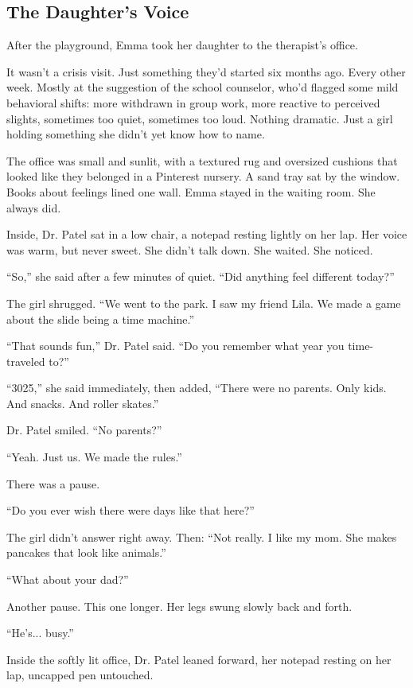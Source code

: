 \subsection{The Daughter’s Voice}

After the playground, Emma took her daughter to the therapist’s office.

It wasn’t a crisis visit. Just something they’d started six months ago. Every other week. Mostly at the suggestion of the school counselor, who’d flagged some mild behavioral shifts: more withdrawn in group work, more reactive to perceived slights, sometimes too quiet, sometimes too loud. Nothing dramatic. Just a girl holding something she didn’t yet know how to name.

The office was small and sunlit, with a textured rug and oversized cushions that looked like they belonged in a Pinterest nursery. A sand tray sat by the window. Books about feelings lined one wall. Emma stayed in the waiting room. She always did.

Inside, Dr. Patel sat in a low chair, a notepad resting lightly on her lap. Her voice was warm, but never sweet. She didn’t talk down. She waited. She noticed.

``So,'' she said after a few minutes of quiet. ``Did anything feel different today?''

The girl shrugged. ``We went to the park. I saw my friend Lila. We made a game about the slide being a time machine.''

``That sounds fun,'' Dr. Patel said. ``Do you remember what year you time-traveled to?''

``3025,'' she said immediately, then added, ``There were no parents. Only kids. And snacks. And roller skates.''

Dr. Patel smiled. ``No parents?''

``Yeah. Just us. We made the rules.''

There was a pause.

``Do you ever wish there were days like that here?''

The girl didn’t answer right away. Then: ``Not really. I like my mom. She makes pancakes that look like animals.''

``What about your dad?''

Another pause. This one longer. Her legs swung slowly back and forth.

``He’s... busy.''

Inside the softly lit office, Dr. Patel leaned forward, her notepad resting on her lap, uncapped pen untouched.

